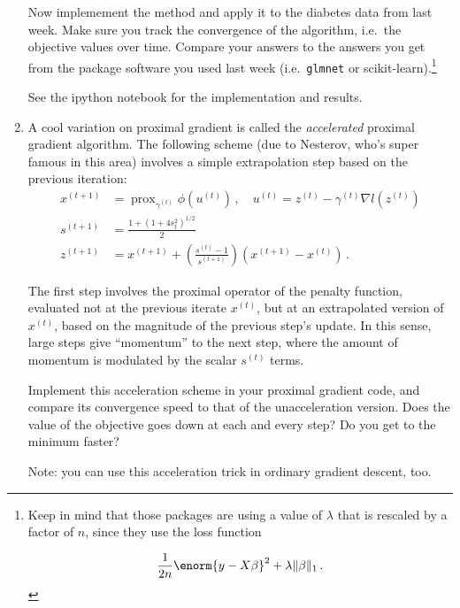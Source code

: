 \documentclass{article}
\DeclareMathOperator*{\prox}{prox}
\begin{document}
\begin{enumerate}[label=(\Alph*)]
{}

Now implemement the method and apply it to the diabetes data from last week.  Make sure you track the convergence of the algorithm, i.e.~the objective values over time.  Compare your answers to the answers you get from the package software you used last week (i.e.~\verb|glmnet| or scikit-learn).\footnote{Keep in mind that those packages are using a value of $\lambda$ that is rescaled by a factor of $n$, since they use the loss function

$$
\frac{1}{2n} \enorm{y - X\beta}^2  + \lambda \Vert \beta \Vert_1 \, .
$$
}

{\color{blue}
See the ipython notebook for the implementation and results.
}

\item A cool variation on proximal gradient is called the \textit{accelerated} proximal gradient algorithm.   The following scheme (due to Nesterov, who's super famous in this area) involves a simple extrapolation step based on the previous iteration:
$$
\begin{aligned}
x^{(t+1)} &= \prox_{ \gamma^{(t)}} \phi(u^{(t)}) \, , \quad u^{(t)} =  z^{(t)} - \gamma^{(t)} \nabla l(z^{(t)})  \\
s^{(t+1)} &= \frac{1 + (1 + 4 s_{t}^2)^{1/2}}{2} \\
z^{(t+1)} &=  x^{(t+1)} + \left( \frac{s^{(t)} - 1}{s^{(t+1)}} \right) (x^{(t+1)} - x^{(t)}) \, .
\end{aligned}
$$



The first step involves the proximal operator of the penalty function, evaluated not at the previous iterate $x^{(t)}$, but at an extrapolated version of $x^{(t)}$, based on the magnitude of the previous step's update.  In this sense, large steps give ``momentum'' to the next step, where the amount of momentum is modulated by the scalar $s^{(t)}$ terms.

Implement this acceleration scheme in your proximal gradient code, and compare its convergence speed to that of the unacceleration version.  Does the value of the objective goes down at each and every step?  Do you get to the minimum faster?

Note: you can use this acceleration trick in ordinary gradient descent, too.

\end{enumerate}
\end{document}
